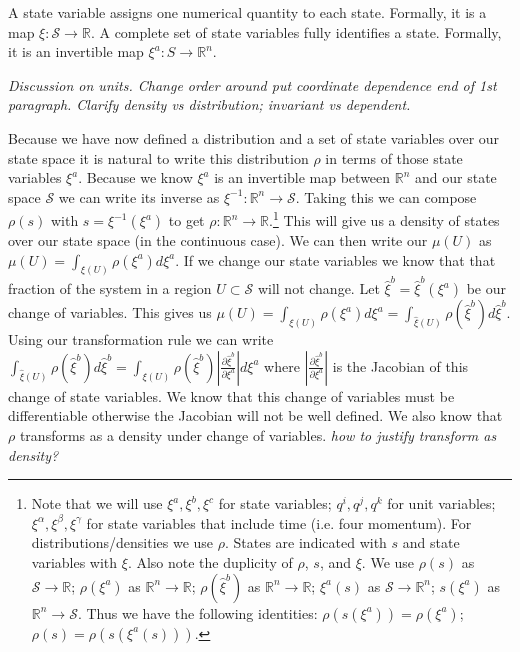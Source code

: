 \documentclass{article}
\begin{document}
\begin{defn}
	A state variable assigns one numerical quantity to each state. Formally, it is a map $\xi : \mathcal{S} \to \mathbb{R}$. A complete set of state variables fully identifies a state. Formally, it is an invertible  map $\xi^a : S \rightarrow \mathbb{R}^n $.
\end{defn}

\emph{Discussion on units. Change order around put coordinate dependence end of 1st paragraph. Clarify density vs distribution; invariant vs dependent.} 
	
	Because we have now defined a distribution and a set of state variables over our state space it is natural to write this distribution $\rho$ in terms of those state variables $\xi^a$. Because we know $\xi^a$ is an invertible map between $\mathbb{R}^n$ and our state space $\mathcal{S}$ we can write its inverse as $\xi^{-1} : \mathbb{R}^n \to \mathcal{S}$. Taking this we can compose $\rho(s)$ with $s = \xi^{-1}(\xi^a)$ to get $\rho : \mathbb{R}^n \to \mathbb{R}$.\footnote{Note that we will use $\xi^a, \xi^b, \xi^c$ for state variables; $q^i, q^j, q^k$ for unit variables; $\xi^\alpha, \xi^\beta, \xi^\gamma$ for state variables that include time (i.e. four momentum). For distributions/densities we use $\rho$. States are indicated with $s$ and state variables with $\xi$. Also note the duplicity of $\rho$, $s$, and $\xi$. We use $\rho(s)$ as $\mathcal{S} \to \mathbb{R}$; $\rho(\xi^a)$ as $\mathbb{R}^n \to \mathbb{R}$; $\rho(\hat{\xi}^b)$ as $\mathbb{R}^n \to \mathbb{R}$; $\xi^a(s)$ as $\mathcal{S} \to \mathbb{R}^n$; $s(\xi^a)$ as $\mathbb{R}^n \to \mathcal{S}$.
Thus we have the following identities: $\rho(s(\xi^a)) = \rho(\xi^a)$; $\rho(s) = \rho(s (\xi^a(s)))$.} This will give us a density of states over our state space (in the continuous case). We can then write our $\mu(U)$ as $\mu(U) = \int_{\xi(U)} \rho(\xi^a)d\xi^a$. If we change our state variables we know that that fraction of the system in a region $U \subset \mathcal{S}$ will not change. Let $\hat{\xi}^b = \hat{\xi}^b(\xi^a)$ be our change of variables. This gives us $\mu(U) = \int_{\xi(U)} \rho(\xi^a)d\xi^a = \int_{\hat{\xi}(U)} \rho(\hat{\xi}^b)d\hat{\xi}^b$. Using our transformation rule we can write $\int_{\hat{\xi}(U)} \rho(\hat{\xi}^b)d\hat{\xi}^b = \int_{\xi(U)} \rho(\hat{\xi}^b)\left|\frac{\partial\hat{\xi}^b}{\partial\xi^a}\right|d\xi^a$ where $\left|\frac{\partial\hat{\xi}^b}{\partial\xi^a}\right|$ is the Jacobian of this change of state variables. We know that this change of variables must be differentiable otherwise the Jacobian will not be well defined. We also know that $\rho$ transforms as a density under change of variables. \emph{how to justify transform as density?}
\end{document}
